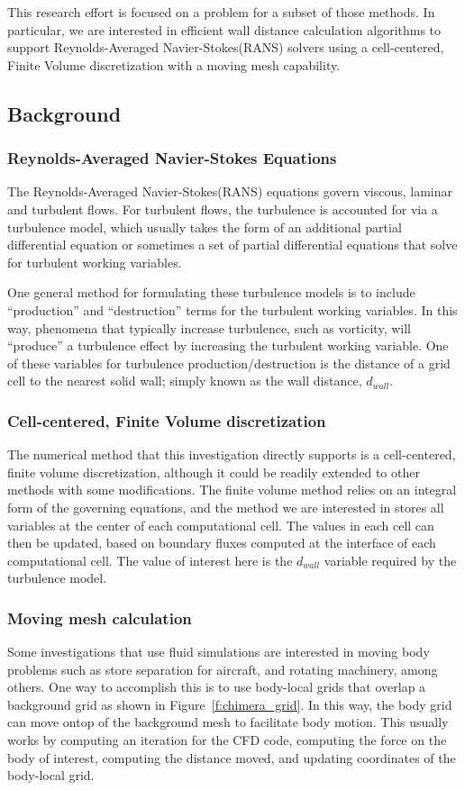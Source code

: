 \documentclass[]{aiaa-tc}%
\begin{document}
This research effort is focused on a problem for a subset
of those methods. In particular, we are interested in efficient wall
distance calculation algorithms to support Reynolds-Averaged
Navier-Stokes(RANS) solvers using a cell-centered, Finite Volume discretization with a
moving mesh capability.

\subsection{Background}

\subsubsection{Reynolds-Averaged Navier-Stokes Equations}
The Reynolds-Averaged Navier-Stokes(RANS) equations govern viscous, laminar
and turbulent flows. For turbulent flows, the turbulence is accounted
for via a turbulence model, which usually takes the
form of an additional partial differential equation or sometimes a set
of partial differential equations that solve for turbulent working
variables.

One general method for formulating these turbulence models is to
include ``production'' and ``destruction'' terms for the turbulent
working variables. In this way, phenomena that typically increase
turbulence, such as vorticity, will ``produce'' a turbulence effect by
increasing the turbulent working variable. One of these variables for
turbulence production/destruction is the distance of a grid cell to
the nearest solid wall; simply known as the wall distance, $d_{wall}$.


\subsubsection{Cell-centered, Finite Volume discretization}
The numerical method that this investigation directly supports is a
cell-centered, finite volume discretization, although it could be
readily extended to other methods with some modifications. The finite
volume method relies on an integral form of the governing equations,
and the method we are interested in stores all variables at the center
of each computational cell. The values in each cell can then be
updated, based on boundary fluxes computed at the interface of each
computational cell. The value of interest here is the $d_{wall}$
variable required by the turbulence model.

\subsubsection{Moving mesh calculation}
Some investigations that use fluid simulations are interested in moving
body problems such as store separation for aircraft, and rotating
machinery, among others. One way to accomplish this is to use
body-local grids that overlap a background grid as shown in Figure~\ref{f:chimera_grid}. In this way, the body
grid can move ontop of the background mesh to facilitate body motion. This
usually works by computing an iteration for the CFD code, computing
the force on the body of interest, computing the distance moved, and
updating coordinates of the body-local grid.
\end{document}
